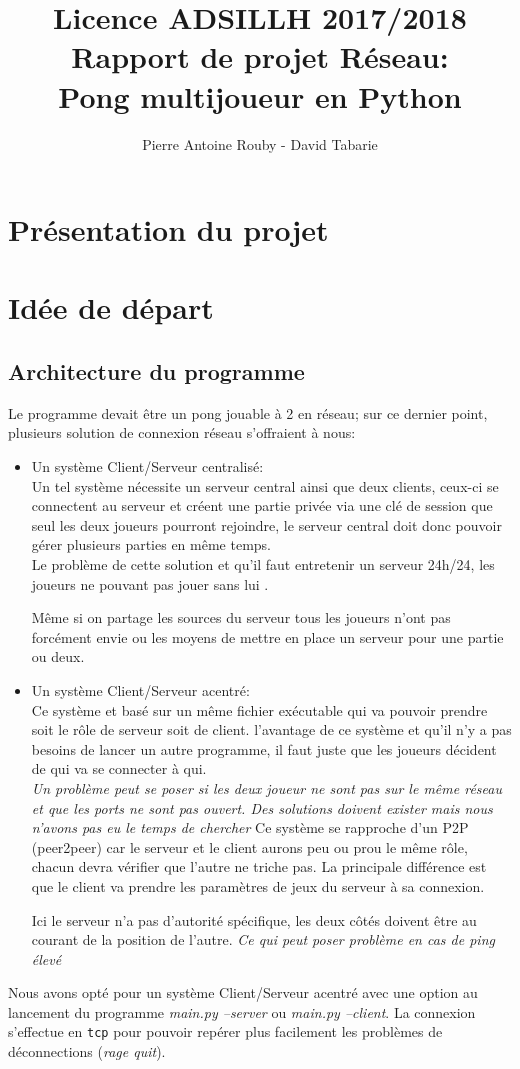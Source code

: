 \documentclass[12pt]{report}
\title{Licence ADSILLH 2017/2018\\Rapport de projet Réseau:\\Pong
  multijoueur en Python}
\author{Pierre Antoine Rouby - David Tabarie\newline}
\date{}
\begin{document}
\maketitle
\tableofcontents

\part{Présentation du projet}

\part{Idée de départ}
\chapter{Architecture du programme}
Le programme devait être un pong jouable à 2 en réseau;
sur ce dernier point, plusieurs solution de connexion réseau
s'offraient à nous:
\begin{itemize}
\item Un système Client/Serveur centralisé: \\
  Un tel système nécessite un serveur central ainsi que deux clients, ceux-ci se
  connectent au serveur et créent une partie privée via une clé de
  session que seul les deux joueurs pourront rejoindre, le serveur
  central doit donc pouvoir gérer plusieurs parties en même temps. \\
  Le problème de cette solution et qu'il faut entretenir un serveur
  24h/24, les joueurs ne pouvant pas jouer sans lui .
  
  Même si on partage les sources du serveur tous les joueurs n'ont pas forcément
  envie ou les moyens de mettre en place un serveur pour une partie ou deux.
\item Un système Client/Serveur acentré: \\
  Ce système et basé sur un même fichier exécutable qui va pouvoir prendre
  soit le rôle de serveur soit de client. l'avantage de ce système et qu'il n'y
  a pas besoins de lancer un autre programme, il faut juste que les
  joueurs décident de qui va se connecter à qui. \\
  \textit{Un problème peut se poser si les deux joueur ne sont pas sur le même
    réseau et que les ports ne sont pas ouvert. Des solutions doivent exister
    mais nous n'avons pas eu le temps de chercher}
  Ce système se rapproche d'un P2P (peer2peer) car le serveur et le client
  aurons peu ou prou le même rôle, chacun devra vérifier que l'autre ne triche
  pas. La principale différence est que le client va prendre les paramètres de
  jeux du serveur à sa connexion.
  
  Ici le serveur n'a pas d'autorité spécifique, les deux côtés doivent être au
  courant de la position de l'autre.
  \textit{Ce qui peut poser problème en cas de ping élevé}
\end{itemize}
Nous avons opté pour un système Client/Serveur acentré avec une option au
lancement du programme \textit{main.py --server} ou \textit{main.py --client}.
La connexion s'effectue en \texttt{tcp} pour pouvoir repérer plus
facilement les problèmes de déconnections (\textit{rage quit}).
\end{document}
